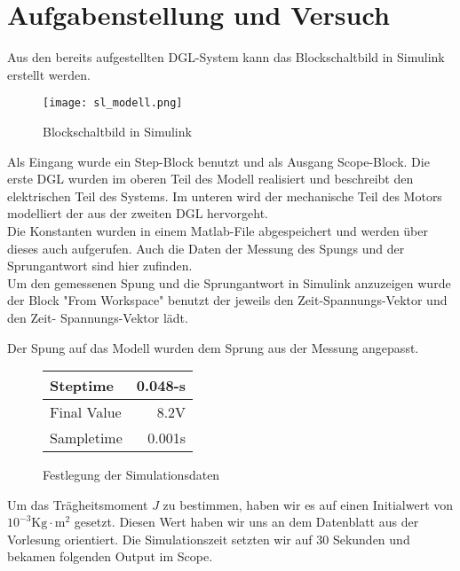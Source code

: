 \section{Aufgabenstellung und Versuch}

Aus den bereits aufgestellten DGL-System kann das Blockschaltbild in Simulink
erstellt werden.

\begin{figure}[H]
    \centering
    \texttt{[image: sl\_modell.png]}
    \caption{Blockschaltbild in Simulink}
    \label{fig:Blockschaltbild}
\end{figure}

Als Eingang wurde ein Step-Block benutzt und als Ausgang Scope-Block.
Die erste DGL wurden im oberen Teil des Modell realisiert und beschreibt
den elektrischen Teil des Systems. Im unteren wird der mechanische Teil
des Motors modelliert der aus der zweiten DGL hervorgeht.\\

Die Konstanten wurden in einem Matlab-File abgespeichert und werden über
dieses auch aufgerufen. Auch die Daten der Messung des Spungs und der
Sprungantwort sind hier zufinden.\\

Um den gemessenen Spung und die Sprungantwort in Simulink anzuzeigen wurde der Block
"From Workspace" benutzt der jeweils den Zeit-Spannungs-Vektor und den Zeit-
Spannungs-Vektor lädt.

Der Spung auf das Modell wurden dem Sprung aus der Messung angepasst.\\

\begin{figure}[H]
    \centering    
    \begin{tabular}[h]{l| r}
        Steptime & 0.048-s \\
        \hline
        Final Value & 8.2V \\
        \hline
        Sampletime & 0.001s \\
    \end{tabular}
    \caption{Festlegung der Simulationsdaten}
\end{figure}
    

Um das Trägheitsmoment $J$ zu bestimmen, haben wir es auf einen Initialwert
von $10^{-3}\mathrm{Kg \cdot m^2}$ gesetzt. Diesen Wert haben wir uns an dem
Datenblatt aus der Vorlesung orientiert. Die Simulationszeit setzten wir auf
30 Sekunden und bekamen folgenden Output im Scope.



